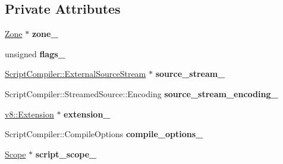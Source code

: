 \subsection*{Private Attributes}
\begin{DoxyCompactItemize}
\item 
\hyperlink{classv8_1_1internal_1_1_zone}{Zone} $\ast$ {\bfseries zone\+\_\+}\hypertarget{classv8_1_1internal_1_1_parse_info_a444a5c58d1366fae6d621b5058b39d3d}{}\label{classv8_1_1internal_1_1_parse_info_a444a5c58d1366fae6d621b5058b39d3d}

\item 
unsigned {\bfseries flags\+\_\+}\hypertarget{classv8_1_1internal_1_1_parse_info_a5c9de948c3dafa065e345d3ee0864481}{}\label{classv8_1_1internal_1_1_parse_info_a5c9de948c3dafa065e345d3ee0864481}

\item 
\hyperlink{classv8_1_1_script_compiler_1_1_external_source_stream}{Script\+Compiler\+::\+External\+Source\+Stream} $\ast$ {\bfseries source\+\_\+stream\+\_\+}\hypertarget{classv8_1_1internal_1_1_parse_info_ad55b2603f8d1c8517703f48863235556}{}\label{classv8_1_1internal_1_1_parse_info_ad55b2603f8d1c8517703f48863235556}

\item 
Script\+Compiler\+::\+Streamed\+Source\+::\+Encoding {\bfseries source\+\_\+stream\+\_\+encoding\+\_\+}\hypertarget{classv8_1_1internal_1_1_parse_info_a20f48c5c748dd014ddfb67665f97e637}{}\label{classv8_1_1internal_1_1_parse_info_a20f48c5c748dd014ddfb67665f97e637}

\item 
\hyperlink{classv8_1_1_extension}{v8\+::\+Extension} $\ast$ {\bfseries extension\+\_\+}\hypertarget{classv8_1_1internal_1_1_parse_info_ad7463ddb38e7e50f6b0d6c263e508646}{}\label{classv8_1_1internal_1_1_parse_info_ad7463ddb38e7e50f6b0d6c263e508646}

\item 
Script\+Compiler\+::\+Compile\+Options {\bfseries compile\+\_\+options\+\_\+}\hypertarget{classv8_1_1internal_1_1_parse_info_a6f10483b67cfd54822c571d3670a01be}{}\label{classv8_1_1internal_1_1_parse_info_a6f10483b67cfd54822c571d3670a01be}

\item 
\hyperlink{classv8_1_1internal_1_1_scope}{Scope} $\ast$ {\bfseries script\+\_\+scope\+\_\+}\hypertarget{classv8_1_1internal_1_1_parse_info_a015889ae62df4985abaffecd0af9666b}{}\label{classv8_1_1internal_1_1_parse_info_a015889ae62df4985abaffecd0af9666b}


\end{DoxyCompactItemize}
